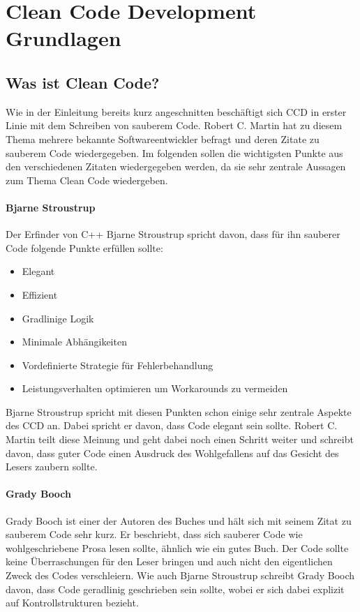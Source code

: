 \chapter{Clean Code Development Grundlagen}
\section{Was ist Clean Code?}
Wie in der Einleitung bereits kurz angeschnitten beschäftigt sich CCD in erster Linie mit dem Schreiben von sauberem Code. Robert C. Martin hat zu diesem Thema mehrere bekannte Softwareentwickler befragt und deren Zitate zu sauberem Code wiedergegeben. Im folgenden sollen die wichtigsten Punkte aus den verschiedenen Zitaten wiedergegeben werden, da sie sehr zentrale Aussagen zum Thema Clean Code wiedergeben.

\subsubsection{Bjarne Stroustrup}
Der Erfinder von C++ Bjarne Stroustrup spricht davon, dass für ihn sauberer Code folgende Punkte erfüllen sollte:

\begin{itemize}
	\item Elegant
	\item Effizient
	\item Gradlinige Logik
	\item Minimale Abhängikeiten
	\item Vordefinierte Strategie für Fehlerbehandlung
	\item Leistungsverhalten optimieren um Workarounds zu vermeiden
\end{itemize}

Bjarne Stroustrup spricht mit diesen Punkten schon einige sehr zentrale Aspekte des CCD an. Dabei spricht er davon, dass Code elegant sein sollte. Robert C. Martin teilt diese Meinung und geht dabei noch einen Schritt weiter und schreibt davon, dass guter Code einen Ausdruck des Wohlgefallens auf das Gesicht des Lesers zaubern sollte. 

\subsubsection{Grady Booch}
Grady Booch ist einer der Autoren des Buches \cite{Booch2004} und hält sich mit seinem Zitat zu sauberem Code sehr kurz. Er beschriebt, dass sich sauberer Code wie wohlgeschriebene Prosa lesen sollte, ähnlich wie ein gutes Buch. Der Code sollte keine Überraschungen für den Leser bringen und auch nicht den eigentlichen Zweck des Codes verschleiern. Wie auch Bjarne Stroustrup schreibt Grady Booch davon, dass Code geradlinig geschrieben sein sollte, wobei er sich dabei explizit auf Kontrollstrukturen bezieht.

